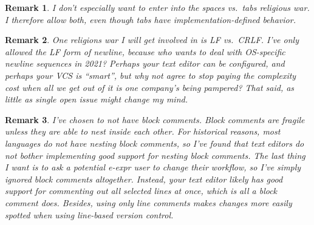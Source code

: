 \documentclass[11pt]{article} %
\newtheorem*{remark}{Remark}
\begin{document}
\begin{remark}
I don't especially want to enter into the spaces vs.\ tabs religious war.
I therefore allow both, even though tabs have implementation-defined behavior.
% 
\end{remark}

\begin{remark}
One religions war I will get involved in is LF vs.\ CRLF.
I've only allowed the LF form of newline, because who wants to deal with OS-specific newline sequences in 2021?
Perhaps your text editor can be configured, and perhaps your VCS is ``smart'', but why not agree to stop paying the complexity cost when all we get out of it is one company's being pampered?
That said, as little as single open issue might change my mind.
\end{remark}

\begin{remark}
I've chosen to not have block comments.
Block comments are fragile unless they are able to nest inside each other.
For historical reasons, most languages do not have nesting block comments, so I've found that text editors do not bother implementing good support for nesting block comments.
The last thing I want is to ask a potential e-expr user to change their workflow, so I've simply ignored block comments altogether.
Instead, your text editor likely has good support for commenting out all selected lines at once, which is all a block comment does.
Besides, using only line comments makes changes more easily spotted when using line-based version control.
\end{remark}
\end{document}
